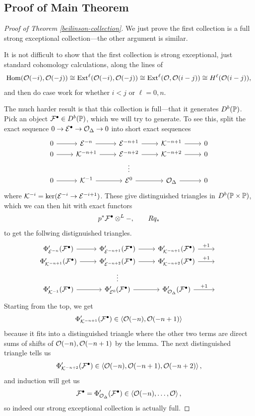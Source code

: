 \documentclass[12pt]{article}
\begin{document}
\subsection{Proof of Main Theorem}

\begin{proof}[Proof of Theorem \ref{beilinson-collection}]
    We just prove the first collection is a full strong exceptional collection---the other argument is similar.

    It is not difficult to show that the first collection is strong exceptional, just standard cohomology calculations, along the lines of
    \[\Hom(\cO(-i),\cO(-j)) \cong \Ext^\ell(\cO(-i),\cO(-j)) \cong \Ext^\ell(\cO,\cO(i-j)) \cong H^\ell(\cO(i-j)),\]
    and then do case work for whether $i<j$ or $\ell=0,n$.

    The much harder result is that this collection is full---that it generates $D^b(\P)$. Pick an object $\cF^\bullet \in D^b(\P)$, which we will try to generate. To see this, split the exact sequence $0\to \cE^\bullet \to \cO_\Delta \to 0$ into short exact sequences
    \[\begin{tikzcd}[row sep=0cm]
        0 \rar & \cE^{-n} \rar & \cE^{-n+1} \rar & \cK^{-n+1} \rar & 0\\
        0 \rar & \cK^{-n+1} \rar & \cE^{-n+2} \rar & \cK^{-n+2} \rar & 0\\
        & & \vdots & &\\
        0 \rar & \cK^{-1} \rar & \cE^0 \rar & \cO_\Delta \rar & 0
    \end{tikzcd}\]
    where $\cK^{-i} = \ker(\cE^{-i} \to \cE^{-i+1})$. These give distinguished triangles in $D^b(\P\times \P)$, which we can then hit with exact functors
    \[p^*\cF^\bullet \otimes^L -, \qquad Rq_*\]
    to get the follwing distignuished triangles.
    \[\begin{tikzcd}[row sep=0cm]
        \Phi_{\cE^{-n}}'(\cF^\bullet) \rar & \Phi_{\cE^{-n+1}}'(\cF^\bullet) \rar & \Phi_{\cK^{-n+1}}'(\cF^\bullet) \rar["+1"] & \phantom{}\\
        \Phi_{\cK^{-n+1}}'(\cF^\bullet) \rar & \Phi_{\cE^{-n+2}}'(\cF^\bullet) \rar & \Phi_{\cK^{-n+2}}'(\cF^\bullet) \rar["+1"] & \phantom{}\\
        & \vdots & &\\
        \Phi_{\cK^{-1}}'(\cF^\bullet) \rar & \Phi_{\cE^0}'(\cF^\bullet) \rar & \Phi_{\cO_\Delta}'(\cF^\bullet) \rar["+1"] & \phantom{}
    \end{tikzcd}\]
    Starting from the top, we get
    \[\Phi_{\cK^{-n+1}}'(\cF^\bullet) \in \<\cO(-n),\cO(-n+1)\>\]
    because it fits into a distinguished triangle where the other two terms are direct sums of shifts of $\cO(-n),\cO(-n+1)$ by the lemma. The next distinguished triangle tells us
    \[\Phi'_{\cK^{-n+2}}(\cF^\bullet) \in \<\cO(-n),\cO(-n+1),\cO(-n+2)\>,\]
    and induction will get us
    \[\cF^\bullet = \Phi_{\cO_\Delta}'(\cF^\bullet) \in \<\cO(-n),\dots,\cO\>,\]
    so indeed our strong exceptional collection is actually full.
\end{proof}
\end{document}
